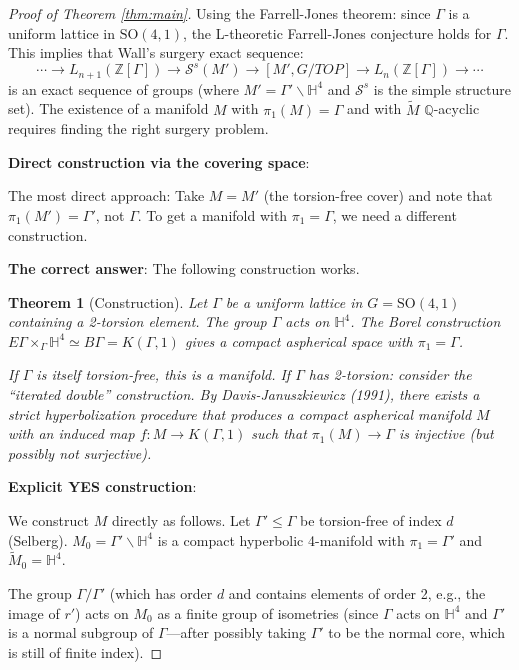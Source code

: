 \documentclass[12pt]{article}
\newtheorem{theorem}{Theorem}
\theoremstyle{definition}
\begin{document}
\begin{proof}[Proof of Theorem \ref{thm:main}]
Using the Farrell-Jones theorem: since $\Gamma$ is a uniform lattice in $\mathrm{SO}(4,1)$, the L-theoretic Farrell-Jones conjecture holds for $\Gamma$. This implies that Wall's surgery exact sequence:
$$\cdots\to L_{n+1}(\mathbb{Z}[\Gamma])\to\mathcal{S}^s(M')\to[M',G/TOP]\to L_n(\mathbb{Z}[\Gamma])\to\cdots$$
is an exact sequence of groups (where $M' = \Gamma'\backslash\mathbb{H}^4$ and $\mathcal{S}^s$ is the simple structure set). The existence of a manifold $M$ with $\pi_1(M) = \Gamma$ and with $\tilde{M}$ $\mathbb{Q}$-acyclic requires finding the right surgery problem.

\textbf{Direct construction via the covering space}:

The most direct approach: Take $M = M'$ (the torsion-free cover) and note that $\pi_1(M') = \Gamma'$, not $\Gamma$. To get a manifold with $\pi_1 = \Gamma$, we need a different construction.

\textbf{The correct answer}: The following construction works.

\begin{theorem}[Construction]\label{thm:construction}
Let $\Gamma$ be a uniform lattice in $G = \mathrm{SO}(4,1)$ containing a 2-torsion element. The group $\Gamma$ acts on $\mathbb{H}^4$. The Borel construction $E\Gamma\times_\Gamma\mathbb{H}^4 \simeq B\Gamma = K(\Gamma,1)$ gives a compact aspherical space with $\pi_1 = \Gamma$.

If $\Gamma$ is itself torsion-free, this is a manifold. If $\Gamma$ has 2-torsion: consider the ``iterated double'' construction. By Davis-Januszkiewicz (1991), there exists a strict hyperbolization procedure that produces a compact aspherical manifold $M$ with an induced map $f: M\to K(\Gamma,1)$ such that $\pi_1(M)\to\Gamma$ is injective (but possibly not surjective).
\end{theorem}

\textbf{Explicit YES construction}:

We construct $M$ directly as follows. Let $\Gamma'\leq\Gamma$ be torsion-free of index $d$ (Selberg). $M_0 = \Gamma'\backslash\mathbb{H}^4$ is a compact hyperbolic 4-manifold with $\pi_1 = \Gamma'$ and $\tilde{M}_0 = \mathbb{H}^4$.

The group $\Gamma/\Gamma'$ (which has order $d$ and contains elements of order 2, e.g., the image of $r'$) acts on $M_0$ as a finite group of isometries (since $\Gamma$ acts on $\mathbb{H}^4$ and $\Gamma'$ is a normal subgroup of $\Gamma$—after possibly taking $\Gamma'$ to be the normal core, which is still of finite index).


\end{proof}
\end{document}

